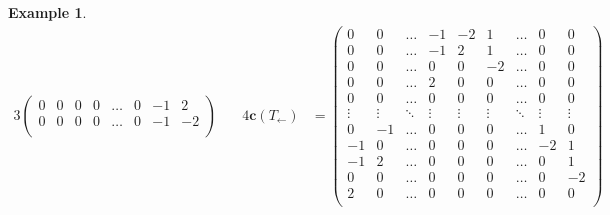 \documentclass{amsart}
\theoremstyle{definition}
\newtheorem{example}[theorem]{Example}
\renewcommand{\b}[1]{{\boldsymbol{#1}}} %
\begin{document}
\begin{example}
\begin{table}
\begin{alignat*}{3}
\begin{pmatrix}
		0 & 0 & 0 & 0 & \dots & 0 & -1 & 2 \\
		0 & 0 & 0 & 0 & \dots & 0 & -1 & -2 \\
	\end{pmatrix}
	\quad &
	4\b{c}(T_\leftarrow) & = \begin{pmatrix}
		0 & 0 & \dots & -1 & -2 & 1 & \dots & 0 & 0 \\
		0 & 0 & \dots & -1 & 2 & 1 & \dots & 0 & 0 \\
		0 & 0 & \dots & 0 & 0 & -2 & \dots & 0 & 0 \\
		0 & 0 & \dots & 2 & 0 & 0 & \dots & 0 & 0 \\
		0 & 0 & \dots & 0 & 0 & 0 & \dots & 0 & 0 \\
		\vdots & \vdots & \ddots & \vdots & \vdots & \vdots & \ddots & \vdots & \vdots \\
		0 & -1 & \dots & 0 & 0 & 0 & \dots & 1 & 0 \\
		-1 & 0 & \dots & 0 & 0 & 0 & \dots & -2 & 1 \\
		-1 & 2 & \dots & 0 & 0 & 0 & \dots & 0 & 1 \\
		0 & 0 & \dots & 0 & 0 & 0 & \dots & 0 & -2 \\
		2 & 0 & \dots & 0 & 0 & 0 & \dots & 0 & 0 \\
	\end{pmatrix}
	\quad
	\\[.3cm]

\end{alignat*}
\end{table}
\end{example}
\end{document}
